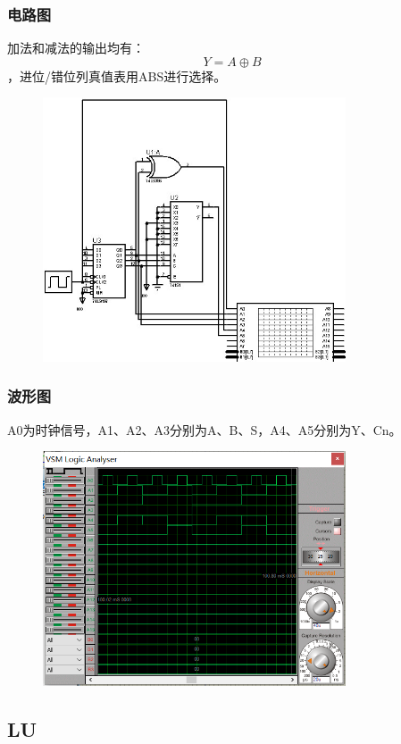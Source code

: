 \documentclass[UTF8, a4paper, 11pt]{article}
\begin{document}
\subsubsection{电路图}
加法和减法的输出均有：
$$Y=A\oplus B$$
，进位/错位列真值表用ABS进行选择。
\begin{figure}[H]
    \centering
    \includegraphics[width=0.8\textwidth]{ex6.2电路图.jpg}
\end{figure}
\subsubsection{波形图}
A0为时钟信号，A1、A2、A3分别为A、B、S，A4、A5分别为Y、Cn。
\begin{figure}[H]
    \centering
    \includegraphics[width=0.8\textwidth]{ex6.2波形图.png}
\end{figure}
\subsection{LU}
\end{document}
